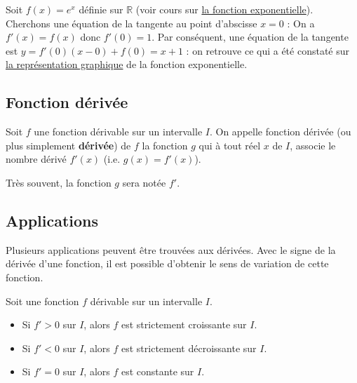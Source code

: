 	\begin{tip}[Exemple]
		Soit $f(x) = e^x$ définie sur $\mathbb{R}$ (voir cours sur \href{https://bacomathiqu.es/cours/premiere/fonction-exponentielle/}{la fonction exponentielle}).
		\newpar
		Cherchons une équation de la tangente au point d'abscisse $x = 0$ :
		\newpar
		On a $f'(x) = f(x)$ donc $f'(0) = 1$.
		\newpar
		Par conséquent, une équation de la tangente est $y = f'(0)(x-0)+f(0) = x + 1$ :
		on retrouve ce qui a été constaté sur \href{https://bacomathiqu.es/cours/premiere/fonction-exponentielle/#3-representation-graphique}{la représentation graphique} de la fonction exponentielle.
	\end{tip}


	\subsection{Fonction dérivée}

	\begin{formula}[Définition]
		Soit $f$ une fonction dérivable sur un intervalle $I$.
		\newpar
		On appelle fonction dérivée (ou plus simplement \textbf{dérivée}) de $f$ la fonction $g$ qui à tout réel $x$ de $I$, associe le nombre dérivé $f'(x)$ (i.e. $g(x) = f'(x)$).
	\end{formula}

	Très souvent, la fonction $g$ sera notée $f'$.

	\subsection{Applications}

	Plusieurs applications peuvent être trouvées aux dérivées. Avec le signe de la dérivée d'une fonction, il est possible d'obtenir le sens de variation de cette fonction.

	\begin{formula}
		Soit une fonction $f$ dérivable sur un intervalle $I$.
		\begin{itemize}
			\item Si $f' > 0$ sur $I$, alors $f$ est strictement croissante sur $I$.
			\item Si $f' < 0$ sur $I$, alors $f$ est strictement décroissante sur $I$.
			\item Si $f' = 0$ sur $I$, alors $f$ est constante sur $I$.
		\end{itemize}
	\end{formula}

